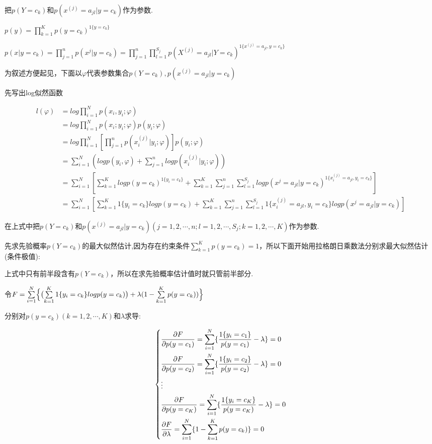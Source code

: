 \documentclass[UTF8]{ctexart}
\begin{document}
把$p(Y=c_k)$和$p(x^{(j)}=a_{jl}|y=c_{k})$作为参数.

$p(y)=\prod^K_{k=1} p(y=c_k)^{1 \{y=c_{k}\} }$

$p(x|y=c_k)= \prod^n_{j=1}p(x^j|y=c_k)= \prod^n_{j=1} \prod^{S_j}_{l=1} p(X^{(j)}=a_{jl}|Y=c_{k})^{1 \{x^{(j)}=a_{jl},y=c_k\} }$

为叙述方便起见，下面以$\varphi$代表参数集合${p(Y=c_k),p(x^{(j)}=a_{jl}|y=c_{k})}$

先写出log似然函数

\begin{equation*}
  \begin{split}
l(\varphi) &=log \prod^N_{i=1} p(x_i,y_i;\varphi) \\
             &=log \prod^N_{i=1} p(x_i;y_i;\varphi)p(y_i;\varphi) \\
            &=log \prod^N_{i=1}[\prod^n_{j=1} p(x^{(j)}_i | y_i;\varphi) ]p(y_i;\varphi) \\
            &= \sum^N_{i=1}(log p(y_i,\varphi)+ \sum^n_{j=1} log p(x^{(j)}_i|y_i;\varphi)) \\
            &=\sum^N_{i=1}[\sum^K_{k=1} log p(y=c_k)^{1\{y_i=c_k\} }+ \sum^{K}_{k=1}\sum^n_{j=1} \sum^{S_j}_{l=1} log p(x^j=a_{jl}|y=c_k)^{1\{x^{(j)}_i=a_{jl},y_i=c_k\} }] \\
            &=\sum^N_{i=1}[\sum^K_{k=1} 1\{y_i=c_k\} log p(y=c_k)+\sum^{K}_{k=1} \sum^n_{j=1} \sum^{S_j}_{l=1} 1\{x^{(j)}_i=a_{jl},y_i=c_k\} logp(x^j=a_{jl}|y=c_k)]
        \end{split}
\end{equation*}

在上式中把$p(Y=c_k)\mbox{和} p(x^{(j)}=a_{jl}|y=c_{k})(j=1,2,\cdots,n;l=1,2,\cdots,S_j;k=1,2,\cdots,K)$作为参数.

先求先验概率$p(Y=c_k)$的最大似然估计,因为存在约束条件$\sum^K_{k=1} p(y=c_k)=1$，所以下面开始用拉格朗日乘数法分别求最大似然估计(条件极值):

上式中只有前半段含有$p(Y=c_k)$，所以在求先验概率估计值时就只管前半部分.

令$F=\sum\limits^N_{i=1} \Bigl\{ \bigl(\sum\limits^K_{k=1} 1\{y_i=c_k\}log p(y=c_k)\bigr)+ \lambda (1-\sum\limits^K_{k=1} p(y=c_k) ) \Bigr\}$

分别对$p(y=c_{k})(k=1,2,\cdots,K) \mbox{和} \lambda$求导:

\begin{equation}
  \left\{ \begin{lgathered}
      \frac{\partial F}{\partial p(y=c_{1})} = \sum\limits^N_{i=1} \{\frac{1\{y_i=c_{1}\}}{p(y=c_{1})} -\lambda\}=0 \\
      \frac{\partial F}{\partial p(y=c_{2})}= \sum\limits^N_{i=1} \{\frac{1\{y_i=c_{2}\}}{p(y=c_{2})} -\lambda\}=0 \\
              \vdots \\
              \frac{\partial F}{\partial p(y=c_{K})}= \sum\limits^N_{i=1} \{\frac{1\{y_i=c_{K}\}}{p(y=c_{K})} -\lambda\}=0 \\
      \frac{\partial F}{\partial \lambda } =\sum\limits^N_{i=1}\{1-\sum\limits^K_{k=1} p(y=c_k)        \}=0
      \end{lgathered} \right.
\end{equation}
\end{document}
